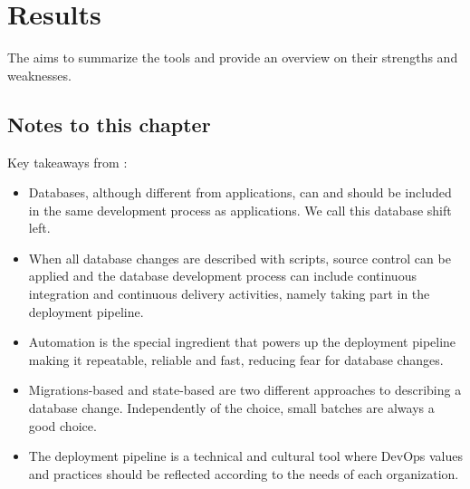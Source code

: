 
\chapter{Results}
The aims to summarize the tools and provide an overview on their strengths and weaknesses. \\

\section{Notes to this chapter}
Key takeaways from \cite{Piairo2018}:\\

\begin{itemize}
	\item Databases, although different from applications, can and should be included in the same development process as applications. We call this database shift left.
	\item When all database changes are described with scripts, source control can be applied and the database development process can include continuous integration and continuous delivery activities, namely taking part in the deployment pipeline.
	\item Automation is the special ingredient that powers up the deployment pipeline making it repeatable, reliable and fast, reducing fear for database changes.
	\item Migrations-based and state-based are two different approaches to describing a database change. Independently of the choice, small batches are always a good choice.
	\item The deployment pipeline is a technical and cultural tool where DevOps values and practices should be reflected according to the needs of each organization.    
\end{itemize}







